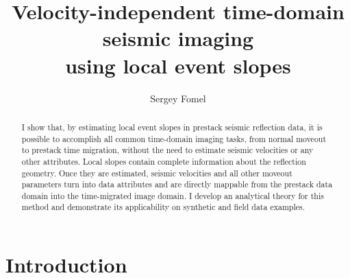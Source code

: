 \title{Velocity-independent time-domain seismic imaging \\ using
local event slopes}



\author{Sergey Fomel}
\address{Bureau of Economic Geology, \\
John A. and Katherine G. Jackson School of Geosciences \\
The University of Texas at Austin \\
University Station, Box X \\
Austin, TX 78713-8972}

\maketitle

\begin{abstract}
  I show that, by estimating local event slopes in prestack seismic
  reflection data, it is possible to accomplish all common time-domain
  imaging tasks, from normal moveout to prestack time migration,
  without the need to estimate seismic velocities or any other
  attributes. Local slopes contain complete information about the
  reflection geometry. Once they are estimated, seismic velocities and
  all other moveout parameters turn into data attributes and are
  directly mappable from the prestack data domain into the
  time-migrated image domain. I develop an analytical theory for this
  method and demonstrate its applicability on synthetic and field data
  examples.
\end{abstract}

\section{Introduction}

